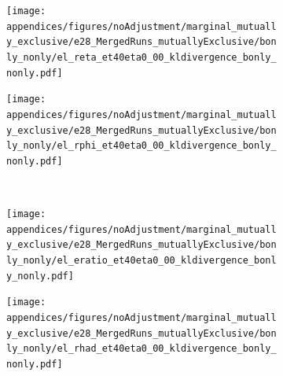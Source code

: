\begin{figure}[hbt]
\begin{center}
\begin{subfigure}[c]{.48\textwidth}
\centering
\texttt{[image: appendices/figures/noAdjustment/marginal\_mutually\_exclusive/e28\_MergedRuns\_mutuallyExclusive/bonly\_nonly/el\_reta\_et40eta0\_00\_kldivergence\_bonly\_nonly.pdf]}
\caption{}%
\label{fig:pseudo_reta}
\end{subfigure}
\hfill
\begin{subfigure}[c]{.48\textwidth}
\centering
\texttt{[image: appendices/figures/noAdjustment/marginal\_mutually\_exclusive/e28\_MergedRuns\_mutuallyExclusive/bonly\_nonly/el\_rphi\_et40eta0\_00\_kldivergence\_bonly\_nonly.pdf]}
\caption{}%
\label{fig:pseudo_rphi}
\end{subfigure} \\
\begin{subfigure}[c]{.48\textwidth}
\centering
\texttt{[image: appendices/figures/noAdjustment/marginal\_mutually\_exclusive/e28\_MergedRuns\_mutuallyExclusive/bonly\_nonly/el\_eratio\_et40eta0\_00\_kldivergence\_bonly\_nonly.pdf]}
\caption{}%
\label{fig:pseudo_eratio}
\end{subfigure}
\hfill
\begin{subfigure}[c]{.48\textwidth}
\centering
\texttt{[image: appendices/figures/noAdjustment/marginal\_mutually\_exclusive/e28\_MergedRuns\_mutuallyExclusive/bonly\_nonly/el\_rhad\_et40eta0\_00\_kldivergence\_bonly\_nonly.pdf]}
\caption{}%
\label{fig:pseudo_rhad}
\end{subfigure} \\
\end{center}
\end{figure}%
